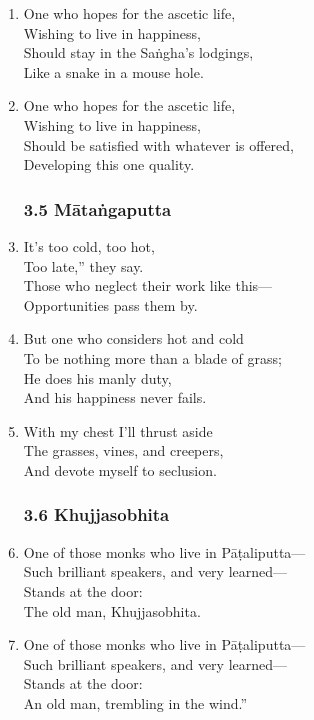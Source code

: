 \documentclass[10pt, openany]{book}
\newcommand*{\vleftofline}[1]{\leavevmode\llap{#1}}
\begin{document}
\begin{enumerate}
\item One who hopes for the ascetic life,\\
Wishing to live in happiness,\\
Should stay in the Saṅgha’s lodgings,\\
Like a snake in a mouse hole.

\item One who hopes for the ascetic life,\\
Wishing to live in happiness,\\
Should be satisfied with whatever is offered,\\
Developing this one quality.

\subsubsection*{3.5 Mātaṅgaputta}

\item \vleftofline{“}It’s too cold, too hot,\\
Too late,” they say.\\
Those who neglect their work like this—\\
Opportunities pass them by.

\item But one who considers hot and cold\\
To be nothing more than a blade of grass;\\
He does his manly duty,\\
And his happiness never fails.

\item With my chest I’ll thrust aside\\
The grasses, vines, and creepers,\\
And devote myself to seclusion.

\subsubsection*{3.6 Khujjasobhita}

\item \vleftofline{“}One of those monks who live in Pāṭaliputta—\\
Such brilliant speakers, and very learned—\\
Stands at the door:\\
The old man, Khujjasobhita.

\item One of those monks who live in Pāṭaliputta—\\
Such brilliant speakers, and very learned—\\
Stands at the door:\\
An old man, trembling in the wind.”


\end{enumerate}
\end{document}
